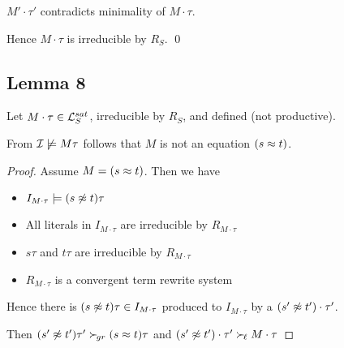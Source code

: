 \documentclass[%
handout,
]{beamer}
\begin{document}
\begin{frame}[allowframebreaks]
\begin{itemize}
            $M'\cdot\tau'$ contradicts minimality of $M\cdot\tau$.
            \hfill\lightning

        \end{itemize}

        Hence $M\cdot\tau$ is irreducible by $R_S$.
        \hfill\qed

\end{frame}

\subsection{Lemma 8}
\begin{frame}

    \begin{lemma}\label{equation}
        Let $M\cdot\tau\in\mathcal{L}_S^{sat}$,
        irreducible by $R_S$, and defined (not productive).

        From $\mathcal{I}\not\models M\tau$ follows that $M$ is not an equation $(s\approx t)$.

    \begin{proof}
        Assume $M = (s\approx t)$. Then we have
        \begin{itemize}
            \item $I_{M\cdot\tau}\models (s\not\approx t)\tau$
            \item All literals in $I_{M\cdot\tau}$ are irreducible by $R_{M\cdot\tau}$
            \item $s\tau$ and $t\tau$ are irreducible by $R_{M\cdot\tau}$
            \item $R_{M\cdot\tau}$ is a convergent term rewrite system
        \end{itemize}
        Hence there is $(s\not\approx t)\tau\in I_{M\cdot\tau}$
        produced to $I_{M\cdot\tau}$ by a $(s'\not\approx t')\cdot\tau'$.

        Then $(s'\not\approx t')\tau'\mathrel\succ_{\!gr} (s\approx t)\tau$ and $(s'\not\approx t')\cdot\tau'\mathrel\succ_{\!\ell} M\cdot\tau$
    \end{proof}
    \end{lemma}
\end{frame}
\end{document}
